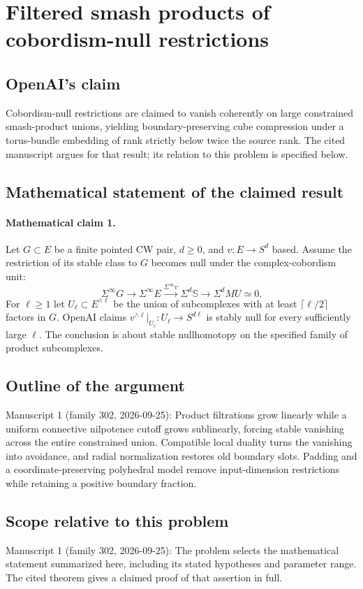 \documentclass[11pt]{article}
\begin{document}
\section*{Filtered smash products of cobordism-null restrictions}

\subsection{OpenAI's claim}
Cobordism-null restrictions are claimed to vanish coherently on large constrained smash-product unions, yielding boundary-preserving cube compression under a torus-bundle embedding of rank strictly below twice the source rank. The cited manuscript argues for that result; its relation to this problem is specified below.

\subsection{Mathematical statement of the claimed result}
\paragraph{Mathematical claim 1.} Let $G\subset E$ be a finite pointed CW pair, $d\ge0$, and $v:E\to S^d$ based. Assume the restriction of its stable class to $G$ becomes null under the complex-cobordism unit:
\[
\Sigma^\infty G\to\Sigma^\infty E\xrightarrow{\Sigma^\infty v}\Sigma^d\mathbb S\to\Sigma^dMU\simeq0.
\]
For $\ell\ge1$ let $U_\ell\subset E^{\wedge\ell}$ be the union of subcomplexes with at least $\lceil\ell/2\rceil$ factors in $G$. OpenAI claims $v^{\wedge\ell}|_{U_\ell}:U_\ell\to S^{d\ell}$ is stably null for every sufficiently large $\ell$. The conclusion is about stable nullhomotopy on the specified family of product subcomplexes.

\subsection{Outline of the argument}
Manuscript 1 (family 302, 2026-09-25): Product filtrations grow linearly while a uniform connective nilpotence cutoff grows sublinearly, forcing stable vanishing across the entire constrained union. Compatible local duality turns the vanishing into avoidance, and radial normalization restores old boundary slots. Padding and a coordinate-preserving polyhedral model remove input-dimension restrictions while retaining a positive boundary fraction.

\subsection{Scope relative to this problem}
Manuscript 1 (family 302, 2026-09-25): The problem selects the mathematical statement summarized here, including its stated hypotheses and parameter range. The cited theorem gives a claimed proof of that assertion in full.
\end{document}
